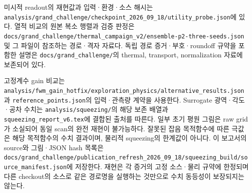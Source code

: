 \documentclass[11pt,a4paper]{article}
\newcommand{\code}[1]{\nolinkurl{#1}}
\begin{document}
미시적 readout의 재현값과 입력·환경·소스 해시는
\code{analysis/grand_challenge/checkpoint_2026_09_18/utility_probe.json}에 있다.
열적 비교의 원본 복소 행렬과 검증 판정은
\code{docs/grand_challenge/thermal_campaign_v2/ensemble-p2-three-seeds.json} 및
그 파일이 참조하는 경로·격자 자료다. 독립 경로 증거·부호·roundoff 규약을
포함한 설명은 \code{docs/grand_challenge/}의 thermal, transport,
normalization 자료에 보존되어 있다.

\begingroup\raggedright
고정계수 gain 비교는
\code{analysis/fwm_gain_hotfix/exploration_physics/alternative_results.json}과
\code{reference_points.json}의 입력·관측량 계약을 사용한다.
Surrogate 광역·각도·공차 수치는
\code{analysis/squeezing/}의 해당 보존 배열과
\code{squeezing_report_v6.tex}에 결합된 출처를 따른다.
일부 초기 평원 그림은 raw grid가 소실되어 동일 scan의 완전 재현이 불가능하다.
잘못된 잡음 목적함수에 따른 극값은 해당 목적함수의 수치 결과이며,
물리적 squeezing의 한계값이 아니다.
이 보고서의 source와 그림·JSON hash 목록은
\code{docs/grand_challenge/publication_refresh_2026_09_18/squeezing_build/source_manifest.json}에 저장한다. 재현은 각 증거의 고정
소스·물리 규약에 한정되며 다른 checkout의 소스로 같은 경로명을 실행하는
것만으로 수치 동등성이 보장되지는 않는다.\par
\endgroup
\end{document}
